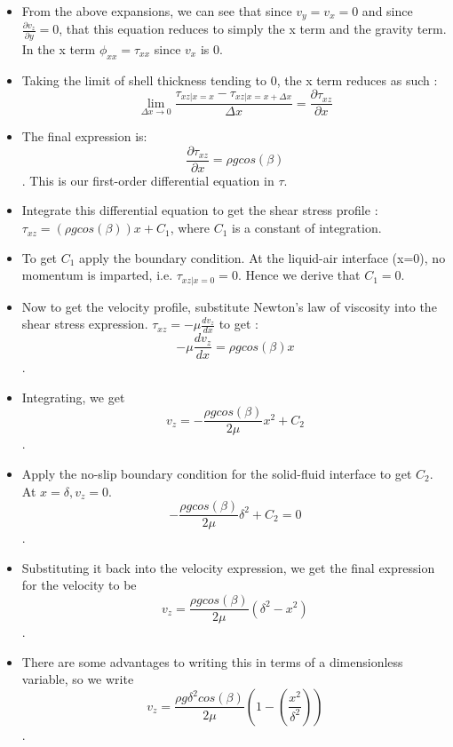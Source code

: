 \begin{itemize}
    \item From the above expansions, we can see that since $v_{y} = v_{x} = 0$ and since $\frac{\partial v_{z}}{\partial y} = 0$, that this equation reduces to simply the x term and the gravity term. In the x term $\phi_{xx} = \tau_{xx}$ since $v_{x}$ is 0.

    \item Taking the limit of shell thickness tending to 0, the x term reduces as such : $$\lim_{\Delta x \to 0} \frac{\tau_{xz|x=x} - \tau_{xz|x=x+\Delta x}}{\Delta x} = \frac{\partial \tau_{xz}}{\partial x}$$


    \item The final expression is: $$\frac{\partial \tau_{xz}}{\partial x} = \rho g cos(\beta)$$. This is our first-order differential equation in $\tau$. 

    \item Integrate this differential equation to get the shear stress profile : $\tau_{xz} = (\rho g cos(\beta)) x + C_{1}$, where $C_{1}$ is a constant of integration.

    \item To get $C_1$ apply the boundary condition. At the liquid-air interface (x=0), no momentum is imparted, i.e. $\tau_{xz|x=0} = 0$. Hence we derive that $C_1 = 0$.

    \item Now to get the velocity profile, substitute Newton's law of viscosity into the shear stress expression. $\tau_{xz} = -\mu \frac{d v_{z}}{dx}$ to get : $$-\mu \frac{dv_{z}}{dx} = \rho g cos(\beta) x$$.

    \item Integrating, we get $$v_{z} = -\frac{\rho g cos(\beta)}{2 \mu} x^{2} + C_{2}$$.

    \item Apply the no-slip boundary condition for the solid-fluid interface to get $C_{2}$. At $x = \delta, v_z = 0$. $$-\frac{\rho g cos(\beta)}{2 \mu} \delta^2 + C_{2} = 0$$.

    \item Substituting it back into the velocity expression, we get the final expression for the velocity to be $$v_{z} = \frac{\rho g cos(\beta)}{2 \mu} (\delta^2 - x^2)$$.

    \item There are some advantages to writing this in terms of a dimensionless variable, so we write $$v_{z} = \frac{\rho g \delta^2 cos(\beta)}{2 \mu} (1 - (\frac{x^2}{\delta^2}))$$.

\end{itemize}


